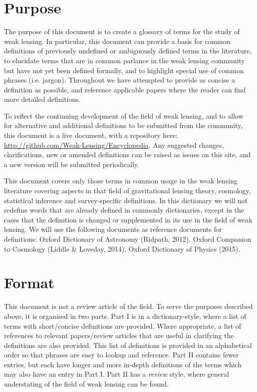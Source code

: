 \documentclass{openjournal}
\begin{document}
\newpage
\section{Purpose}
The purpose of this document is to create a glossary of terms for the
study of weak lensing. In particular, this document can provide a basis for common
definitions of previously undefined or ambiguously defined terms in
the literature, to elucidate terms that are in common parlance in the
weak lensing community but have not yet been defined formally, and to
highlight special use of common phrases (i.e. jargon). Throughout we
have attempted to provide as concise a definition as possible, and
reference applicable papers where the reader can find more detailed
definitions.

To reflect the continuing development of the field of weak lensing,
and to allow for alternative and additional definitions to be
submitted from the community, this document is a live document, with a
repository here: \url{http://github.com/Weak-Lensing/Encyclopedia}. 
Any suggested changes, clarifications, new or amended definitions 
can be raised as issues on this site, and a new version will be submitted 
periodically.

This document covers only those terms in common usage in the weak
lensing literature covering aspects in that field of gravitational
lensing theory, cosmology, statistical inference and survey-specific
definitions. In this dictionary we will not redefine words that are
already defined in commonly dictionaries, except in the cases that the
definition is changed or supplemented in its use in the field of weak
lensing. We will use the following documents as reference documents
for definitions: Oxford Dictionary of Astronomy (Ridpath, 2012),
Oxford Companion to Cosmology (Liddle \& Loveday, 2014), Oxford
Dictionary of Physics (2015).
%
\section{Format}
This document is not a review article of the field. To serve the purposes described above, it
is organised in two parts. 
Part I is in a dictionary-style, where a list of terms with short/concise definitions are provided. 
Where appropriate, a list of references to relevant papers/review articles that are useful in clarifying the
definitions are also provided. This list of definitions is provided in an alphabetical
order so that phrases are easy to lookup and reference.
Part II contains fewer entries, but each have longer and more in-depth 
definitions of the terms which may also have an entry in Part I. Part II has 
a {\it review} style, where general understating of the field of weak lensing  
can be found. 
%
\end{document}
